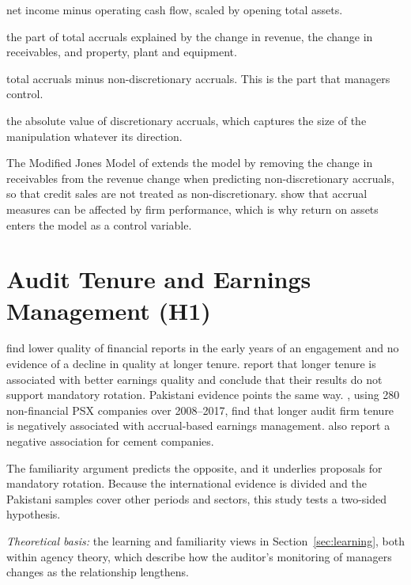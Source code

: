 \begin{description}[leftmargin=0pt,labelindent=0pt,style=unboxed]
  \item[Total accruals (TA):] net income minus operating cash flow, scaled by opening total assets.
  \item[Non-discretionary accruals (NDA):] the part of total accruals explained by the change in revenue, the change in receivables, and property, plant and equipment.
  \item[Discretionary accruals (DA):] total accruals minus non-discretionary accruals. This is the part that managers control.
  \item[Earnings management (EM):] the absolute value of discretionary accruals, which captures the size of the manipulation whatever its direction.
\end{description}

The Modified Jones Model of \textcite{dechow1995} extends the \textcite{jones1991} model by removing the change in receivables from the revenue change when predicting non-discretionary accruals, so that credit sales are not treated as non-discretionary. \textcite{kothari2005} show that accrual measures can be affected by firm performance, which is why return on assets enters the model as a control variable.

\section{Audit Tenure and Earnings Management (H1)}

\textcite{johnson2002} find lower quality of financial reports in the early years of an engagement and no evidence of a decline in quality at longer tenure. \textcite{myers2003} report that longer tenure is associated with better earnings quality and conclude that their results do not support mandatory rotation. Pakistani evidence points the same way. \textcite{kalabeke2019}, using 280 non-financial PSX companies over 2008--2017, find that longer audit firm tenure is negatively associated with accrual-based earnings management. \textcite{alam2023} also report a negative association for cement companies.

The familiarity argument predicts the opposite, and it underlies proposals for mandatory rotation. Because the international evidence is divided and the Pakistani samples cover other periods and sectors, this study tests a two-sided hypothesis.

\emph{Theoretical basis:} the learning and familiarity views in Section~\ref{sec:learning}, both within agency theory, which describe how the auditor's monitoring of managers changes as the relationship lengthens.

